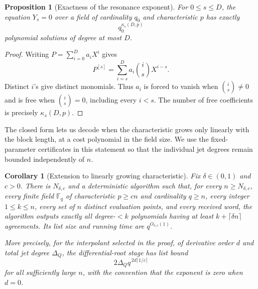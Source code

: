 \documentclass[11pt,letterpaper]{article}
\newtheorem{proposition}[proposition]{Proposition}
\newtheorem{corollary}[corollary]{Corollary}
\theoremstyle{definition}
\newcommand{\F}{\mathbb{F}}
\begin{document}
\begin{proposition}[Exactness of the resonance exponent]
\label{prop:resonance-exponent-exact}
For \(0\leq s\leq D\), the equation \(Y_s=0\) over a field of cardinality
\(q_0\) and characteristic \(p\) has exactly
\begin{equation}
  q_0^{\kappa_s(D,p)}
  \label{eq:resonance-exponent-exact}
\end{equation}
polynomial solutions of degree at most \(D\).
\end{proposition}

\begin{proof}
Writing \(P=\sum_{i=0}^Da_iX^i\) gives
\[
  P^{[s]}=\sum_{i=s}^D a_i\binom isX^{i-s}.
\]
Distinct \(i\)'s give distinct monomials. Thus \(a_i\) is forced to vanish
when \(\binom is\neq0\) and is free when \(\binom is=0\), including every
\(i<s\).  The number of free coefficients is precisely
\(\kappa_s(D,p)\).
\end{proof}

The closed form lets us decode when the characteristic grows only linearly
with the block length, at a cost polynomial in the field size. We use the
fixed-parameter certificates in this statement so that the individual jet
degrees remain bounded independently of \(n\).

\begin{corollary}[Extension to linearly growing characteristic]
\label{cor:linear-characteristic-decoding}
Fix \(\delta\in(0,1)\) and \(c>0\).  There is \(N_{\delta,c}\) and a deterministic
algorithm such that, for every \(n\geq N_{\delta,c}\), every finite field
\(\F_q\) of characteristic \(p\geq cn\) and cardinality \(q\geq n\), every
integer \(1\leq k\leq n\), every
set of \(n\) distinct evaluation points, and every received word, the
algorithm outputs exactly all degree-\(<k\) polynomials having at least
\(k+\lceil\delta n\rceil\) agreements.  Its list size and running time are
\(q^{O_{\delta,c}(1)}\).

More precisely, for the interpolant selected in the proof, of derivative
order \(d\) and total jet degree \(\Delta_Q\), the differential-root stage has list
bound
\begin{equation}
  2\Delta_Q q^{\,2d\lceil1/c\rceil}
  \label{eq:linear-characteristic-root-bound}
\end{equation}
for all sufficiently large \(n\), with the convention that the exponent is
zero when \(d=0\).
\end{corollary}
\end{document}
